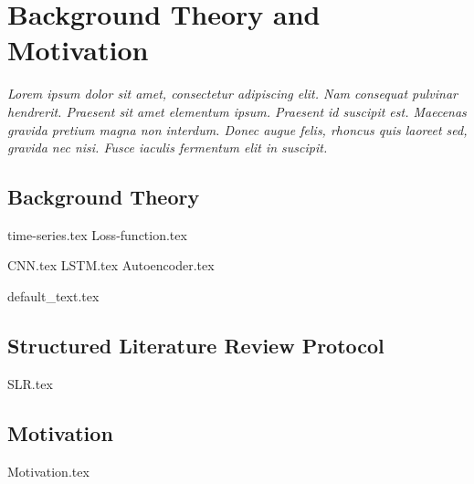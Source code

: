 \chapter{Background Theory and Motivation}\label{T-B}
\label{cha:TheoryAndBackground}

{\it Lorem ipsum dolor sit amet, consectetur adipiscing elit. Nam consequat pulvinar hendrerit. Praesent sit amet elementum ipsum. Praesent id suscipit est. Maecenas gravida pretium magna non interdum. Donec augue felis, rhoncus quis laoreet sed, gravida nec nisi. Fusce iaculis fermentum elit in suscipit.}



\section{Background Theory}
\label{sec:no1}
{time-series.tex}
{Loss-function.tex}

{CNN.tex}
{LSTM.tex}
{Autoencoder.tex}

{default_text.tex}


\section{Structured Literature Review Protocol}
{SLR.tex}



\section{Motivation}
\label{sec:no2}
{Motivation.tex}
